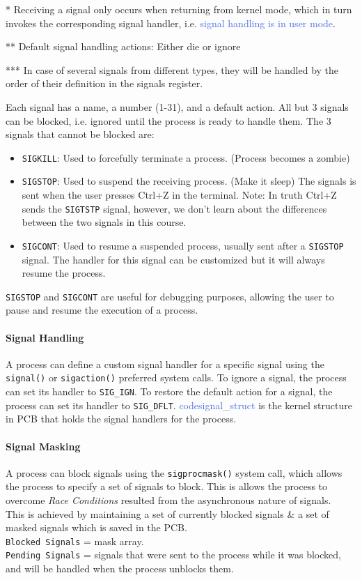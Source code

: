\documentclass[openany,12pt]{book}
\newcommand{\blue}[1]{\textcolor{RoyalBlue}{#1}}
\begin{document}
* Receiving a signal only occurs when returning from kernel mode, which in turn invokes the corresponding signal handler, i.e. \blue{signal handling is in user mode}.

** Default signal handling actions: Either die or ignore

*** In case of several signals from different types, they will be handled by the order of their definition in the signals register.


\vspace{1em}

Each signal has a name, a number (1-31), and a default action. All but 3 signals can be blocked, i.e. ignored until the process is ready to handle them. The 3 signals that cannot be blocked are:
\begin{itemize}
  \item \texttt{SIGKILL}: Used to forcefully terminate a process. (Process becomes a zombie)
  \item \texttt{SIGSTOP}: Used to suspend the receiving process. (Make it sleep) The signals is sent when the user presses Ctrl+Z in the terminal. {\color{gray}Note: In truth Ctrl+Z sends the \texttt{SIGTSTP} signal, however, we don't learn about the differences between the two signals in this course.}
  \item \texttt{SIGCONT}: Used to resume a suspended process, usually sent after a \texttt{SIGSTOP} signal. The handler for this signal can be customized but it {\color{red}will always} resume the process.
\end{itemize}
\texttt{SIGSTOP} and \texttt{SIGCONT} are useful for debugging purposes, allowing the user to pause and resume the execution of a process.

\paragraph{Signal Handling}
A process can define a custom signal handler for a specific signal using the \texttt{signal()} or \texttt{sigaction()} {\color{gray}preferred} system calls.
To ignore a signal, the process can set its handler to \texttt{SIG\_IGN}. To restore the default action for a signal, the process can set its handler to \texttt{SIG\_DFLT}. \blue{code{signal\_struct}} is the kernel structure in PCB that holds the signal handlers for the process.

\paragraph{Signal Masking}
A process can block signals using the \texttt{sigprocmask()} system call, which allows the process to specify a set of signals to block. This is allows the process to overcome \textit{Race Conditions} resulted from the asynchronous nature of signals.\\
\indent This is achieved by maintaining a set of currently blocked signals \& a set of masked signals which is saved in the {\color{blue}PCB}.\\
\texttt{Blocked Signals} = mask array.\\
\texttt{Pending Signals} = signals that were sent to the process while it was blocked, and will be handled when the process unblocks them.
\end{document}
